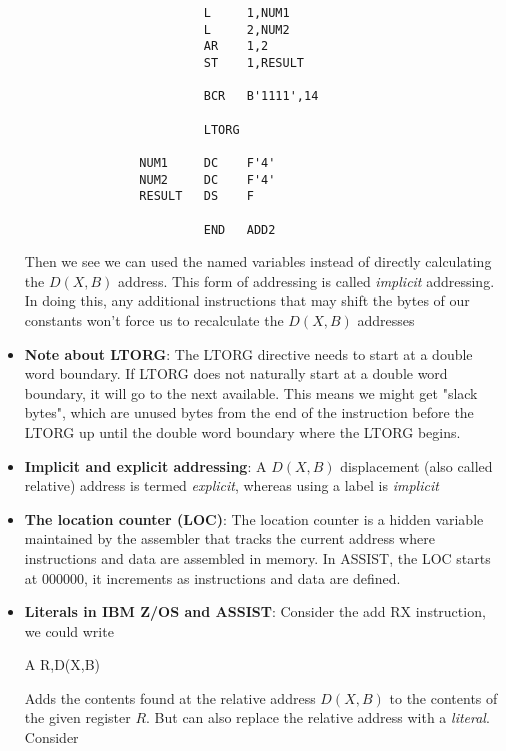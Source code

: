 \documentclass{report}
\begin{document}
\begin{itemize}
\begin{verbatim}
                         L     1,NUM1
                         L     2,NUM2
                         AR    1,2
                         ST    1,RESULT

                         BCR   B'1111',14

                         LTORG

                NUM1     DC    F'4'
                NUM2     DC    F'4'
                RESULT   DS    F

                         END   ADD2
                    \end{verbatim}
                    \bigbreak \noindent 
                    Then we see we can used the named variables instead of directly calculating the $D(X,B)$ address. This form of addressing is called \textit{implicit} addressing. In doing this, any additional instructions that may shift the bytes of our constants won't force us to recalculate the $D(X,B)$ addresses
                \item \textbf{Note about LTORG}: The LTORG directive needs to start at a double word boundary. If LTORG does not naturally start at a double word boundary, it will go to the next available. This means we might get "slack bytes", which are unused bytes from the end of the instruction before the LTORG up until the double word boundary where the LTORG begins.
                \item \textbf{Implicit and explicit addressing}: A $D(X,B)$ displacement (also called relative) address is termed \textit{explicit}, whereas using a label is \textit{implicit}
                \item \textbf{The location counter (LOC)}: The location counter is a hidden variable maintained by the assembler that tracks the current address where instructions and data are assembled in memory.
                    \bigbreak \noindent 
                    In ASSIST, the LOC starts at 000000, it increments as instructions and data are defined.
                \item \textbf{Literals in IBM Z/OS and ASSIST}: Consider the add RX instruction, we could write
                    \bigbreak \noindent 
                    \begin{cppcode}
                    A R,D(X,B)
                    \end{cppcode}
                    \bigbreak \noindent 
                    Adds the contents found at the relative address $D(X,B)$ to the contents of the given register $R$. But can also replace the relative address with a \textit{literal}. Consider 

\end{itemize}
\end{document}
